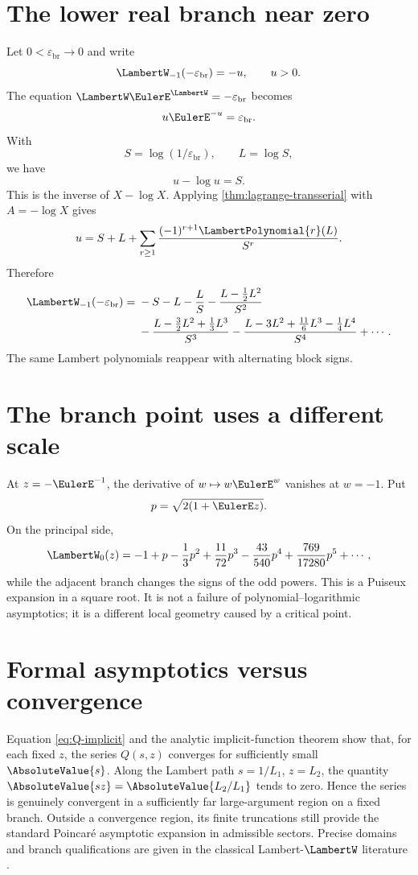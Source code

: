 \documentclass[11pt,oneside]{book}
\theoremstyle{definition}
\theoremstyle{remark}
\newcommand{\LowerBranchParameter}{\varepsilon_{\mathrm{br}}}
\begin{document}
\section{The lower real branch near zero}
Let $0<\LowerBranchParameter\to0$ and write
\[
 \LambertW_{-1}(-\LowerBranchParameter)=-u,
 \qquad u>0.
\]
The equation $\LambertW\EulerE^\LambertW=-\LowerBranchParameter$ becomes
\[
 u\EulerE^{-u}=\LowerBranchParameter.
\]
With
\[
 S=\log(1/\LowerBranchParameter),
 \qquad L=\log S,
\]
we have
\begin{equation}\label{eq:lower-branch-inverse}
 u-\log u=S.
\end{equation}
This is the inverse of $X-\log X$.  Applying
\cref{thm:lagrange-transserial} with $A=-\log X$ gives
\begin{equation}\label{eq:u-lower-branch}
 u=S+L+\sum_{r\ge1}
 \frac{(-1)^{r+1}\LambertPolynomial{r}(L)}{S^r}.
\end{equation}
Therefore
\begin{align}\label{eq:Wminus1-expansion}
 \LambertW_{-1}(-\LowerBranchParameter)={}&-S-L-\frac{L}{S}
 -\frac{L-\frac12L^2}{S^2}\\
 &-\frac{L-\frac32L^2+\frac13L^3}{S^3}
 -\frac{L-3L^2+\frac{11}{6}L^3-\frac14L^4}{S^4}
 +\cdots.\notag
\end{align}
The same Lambert polynomials reappear with alternating block signs.

\section{The branch point uses a different scale}
At $z=-\EulerE^{-1}$, the derivative of $w\mapsto w\EulerE^w$ vanishes at $w=-1$.
Put
\[
 p=\sqrt{2(1+\EulerE z)}.
\]
On the principal side,
\begin{equation}\label{eq:W-branchpoint}
 \LambertW_0(z)=-1+p-\frac13p^2+\frac{11}{72}p^3
 -\frac{43}{540}p^4+\frac{769}{17280}p^5+\cdots,
\end{equation}
while the adjacent branch changes the signs of the odd powers.  This is a
Puiseux expansion in a square root.  It is not a failure of
polynomial--logarithmic asymptotics; it is a different local geometry caused
by a critical point.

\section{Formal asymptotics versus convergence}
Equation \eqref{eq:Q-implicit} and the analytic implicit-function theorem show
that, for each fixed $z$, the series $Q(s,z)$ converges for sufficiently small
$\AbsoluteValue{s}$.  Along the Lambert path $s=1/L_1$, $z=L_2$, the quantity
$\AbsoluteValue{s z}=\AbsoluteValue{L_2/L_1}$ tends to zero.  Hence the series is genuinely convergent in
a sufficiently far large-argument region on a fixed branch.  Outside a
convergence region, its finite truncations still provide the standard
Poincar\'e asymptotic expansion in admissible sectors.  Precise domains and
branch qualifications are given in the classical Lambert-$\LambertW$ literature
\cite{Corless1996,DLMF413}.
\end{document}
